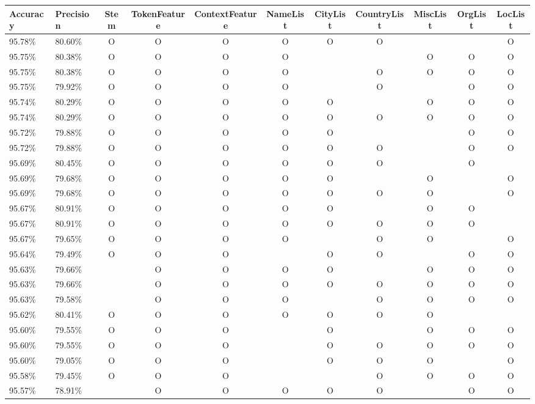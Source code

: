\documentclass[11pt, english]{article}
\begin{document}
\begin{landscape}
  \centering
  \tiny
  \begin{tabular}{ll|ccccccccc}
    Accuracy & Precision & Stem & TokenFeature & ContextFeature & NameList & CityList & CountryList & MiscList & OrgList & LocList\\
    \hline
    95.78\% & 80.60\% & O & O & O & O & O & O &  &  & O\\
    95.75\% & 80.38\% & O & O & O & O &  &  & O & O & O\\
    95.75\% & 80.38\% & O & O & O & O &  & O & O & O & O\\
    95.75\% & 79.92\% & O & O & O & O &  & O &  & O & O\\
    95.74\% & 80.29\% & O & O & O & O & O &  & O & O & O\\
    95.74\% & 80.29\% & O & O & O & O & O & O & O & O & O\\
    95.72\% & 79.88\% & O & O & O & O & O &  &  & O & O\\
    95.72\% & 79.88\% & O & O & O & O & O & O &  & O & O\\
    95.69\% & 80.45\% & O & O & O & O & O & O &  & O & \\
    95.69\% & 79.68\% & O & O & O & O & O &  & O &  & O\\
    95.69\% & 79.68\% & O & O & O & O & O & O & O &  & O\\
    95.67\% & 80.91\% & O & O & O & O & O &  & O & O & \\
    95.67\% & 80.91\% & O & O & O & O & O & O & O & O & \\
    95.67\% & 79.65\% & O & O & O & O &  & O & O &  & O\\
    95.64\% & 79.49\% & O & O & O &  & O & O &  & O & O\\
    95.63\% & 79.66\% &  & O & O & O & O &  & O & O & O\\
    95.63\% & 79.66\% &  & O & O & O & O & O & O & O & O\\
    95.63\% & 79.58\% &  & O & O & O &  & O & O & O & O\\
    95.62\% & 80.41\% & O & O & O & O & O & O & O &  & \\
    95.60\% & 79.55\% & O & O & O &  & O &  & O & O & O\\
    95.60\% & 79.55\% & O & O & O &  & O & O & O & O & O\\
    95.60\% & 79.05\% & O & O & O &  & O & O & O &  & O\\
    95.58\% & 79.45\% & O & O & O &  &  & O & O & O & O\\
    95.57\% & 78.91\% &  & O & O & O & O & O &  & O & O\\

\end{tabular}
\end{landscape}
\end{document}
